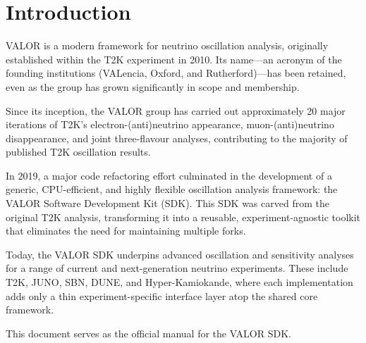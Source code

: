 
\section{Introduction}

VALOR is a modern framework for neutrino oscillation analysis, originally established within the T2K experiment in 2010. Its name—an acronym of the founding institutions (VALencia, Oxford, and Rutherford)—has been retained, even as the group has grown significantly in scope and membership.

Since its inception, the VALOR group has carried out approximately 20 major iterations of T2K’s electron-(anti)neutrino appearance, muon-(anti)neutrino disappearance, and joint three-flavour analyses, contributing to the majority of published T2K oscillation results.

In 2019, a major code refactoring effort culminated in the development of a generic, CPU-efficient, and highly flexible oscillation analysis framework: the VALOR Software Development Kit (SDK). This SDK was carved from the original T2K analysis, transforming it into a reusable, experiment-agnostic toolkit that eliminates the need for maintaining multiple forks.

Today, the VALOR SDK underpins advanced oscillation and sensitivity analyses for a range of current and next-generation neutrino experiments. These include T2K, JUNO, SBN, DUNE, and Hyper-Kamiokande, where each implementation adds only a thin experiment-specific interface layer atop the shared core framework.

This document serves as the official manual for the VALOR SDK.
